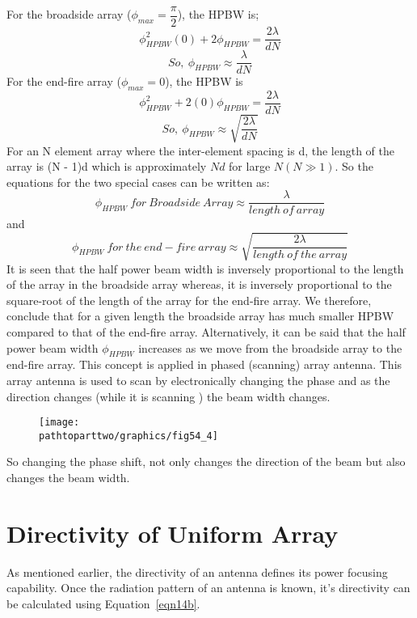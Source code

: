 For the broadside array ($\phi_{max} = \dfrac{\pi}{2}$), the HPBW is; 
$$ \phi^2_{HPBW}(0) + 2\phi_{HPBW} = \dfrac{2\lambda}{dN}$$
\begin{equation}
So, \ \phi_{HPBW} \approx \dfrac{\lambda}{dN}
\label{eqn39} 
\end{equation} 
For the end-fire array ($\phi_{max} = 0$), the HPBW is 
$$ \phi^2_{HPBW} + 2(0)\phi_{HPBW} = \dfrac{2\lambda}{dN} $$
\begin{equation}
So, \ \phi_{HPBW} \approx \sqrt{\dfrac{2\lambda}{dN}}
\label{eqn40}
\end{equation}
For an N element array where the inter-element spacing is d, the length of the array is (N - 1)d which is approximately $Nd$ for large $N(N\gg 1)$. So the equations for the two special cases can be written as: 
$$ \phi_{HPBW} \ for \ Broadside \ Array \approx \dfrac{\lambda}{length \ of \ array}$$ and
$$ \phi_{HPBW} \ for \ the \ end-fire \ array \approx \sqrt{\dfrac{2\lambda}{length \ of \  the \ array}}$$
It is seen that the half power beam width is inversely proportional to the length of the array in the broadside array whereas, it is inversely proportional to the square-root of the length of the array for the end-fire array. We therefore, conclude that for a given length the broadside array has much smaller HPBW compared to that of the end-fire array. Alternatively,
it can be said that the half power beam width $\phi_{HPBW}$ increases as we move from the broadside array to the end-fire array. This concept is applied in phased (scanning) array antenna. This array antenna is used to scan by electronically changing the phase and as the direction changes (while it is scanning ) the beam width changes.
\begin{figure}[h]
\texttt{[image: \\pathtoparttwo/graphics/fig54\_4]}
\centering
\caption{}
\label{54.7}
\end{figure}

So changing the phase shift, not only changes the direction of the beam but also changes the beam width. 

\section{Directivity of Uniform Array}

As mentioned earlier, the directivity of an antenna defines its power focusing capability. Once the radiation pattern of an antenna is known, it's directivity can be calculated using Equation~\ref{eqn14b}.

